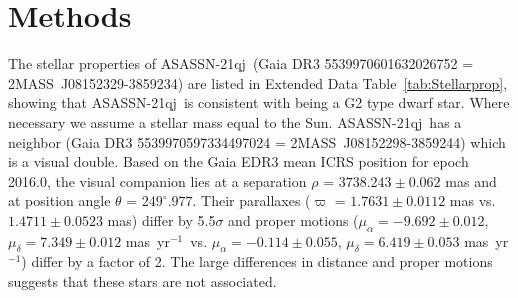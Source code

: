 \documentclass[sn-nature]{sn-jnl}%
\newcommand{\asas}{ASASSN-21qj}
\newcommand{\masyr}{mas~yr$^{-1}$}
\begin{document}
%


\clearpage

\setcounter{figure}{0}    

\renewcommand\figurename{Extended Data Fig.}%
\renewcommand\tablename{Extended Data Table}%



\section{Methods}\label{sec:methods}

The stellar properties of \asas\ (Gaia DR3 5539970601632026752 = 2MASS~J08152329-3859234) are listed in Extended Data Table~\ref{tab:Stellarprop}, showing that \asas\ is consistent with being a G2 type dwarf star.
%
Where necessary we assume a stellar mass equal to the Sun.
%
\asas\  has a neighbor (Gaia DR3 5539970597334497024 = 2MASS~J08152298-3859244) which is a visual double.
%
Based on the Gaia EDR3 mean ICRS position for epoch 2016.0, the visual companion lies at a separation $\rho$ = $3738.243\pm0.062$ mas and at position angle $\theta$ = $249^{\circ}.977$.
%
Their parallaxes ($\varpi$ = $1.7631\pm0.0112$ mas vs. $1.4711\pm0.0523$ mas) differ by 5.5$\sigma$ and proper motions ($\mu_{\alpha} = -9.692\pm0.012$, $\mu_{\delta} = 7.349\pm0.012$ \masyr\, vs. $\mu_{\alpha} = -0.114\pm0.055$, $\mu_{\delta} = 6.419\pm0.053$ \masyr) differ by a factor of 2.
%
The large differences in distance and proper motions suggests that these stars are not associated.

\end{document}
